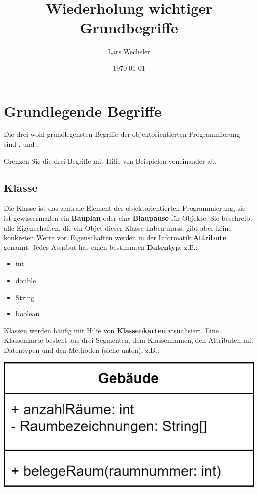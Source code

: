 \documentclass{article}
\author{Lars Wechsler}
\title{Wiederholung wichtiger Grundbegriffe}
\date{\today}
\begin{document}
\maketitle

\section{Grundlegende Begriffe}

Die drei wohl grundlegensten Begriffe der objektorientierten Programmierung sind ,  und .
\begin{task}{1}
Grenzen Sie die drei Begriffe mit Hilfe von Beispielen voneinander ab. 
\end{task}



\subsection{Klasse}
Die Klasse ist das zentrale Element der objektorientierten Programmierung, sie ist gewissermaßen ein \textbf{Bauplan} oder eine \textbf{Blaupause} für Objekte. Sie beschreibt alle Eigenschaften, die ein Objet dieser Klasse haben muss, gibt aber keine konkreten Werte vor. Eigenschaften werden in der Informatik \textbf{Attribute} genannt. Jedes Attribut hat einen bestimmten \textbf{Datentyp}, z.B.:
\begin{itemize}
    \item int
    \item double
    \item String
    \item boolean
\end{itemize}
Klassen werden häufig mit Hilfe von \textbf{Klassenkarten} visualisiert. Eine Klassenkarte besteht aus drei Segmenten, dem Klassennamen, den Attributen mit Datentypen und den Methoden (siehe unten), z.B.:
\begin{center}
    \includegraphics[scale=0.2]{media/class.png}
\end{center}
\end{document}
